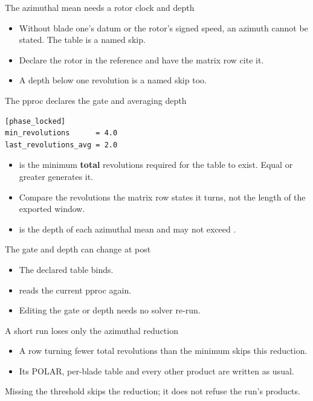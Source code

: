 \begin{frame}{The azimuthal mean needs a rotor clock and depth}
\begin{itemize}
  \item Without blade one's datum or the rotor's signed speed, an azimuth
        cannot be stated. The table is a named skip.
  \item Declare the rotor in the reference and have the matrix row cite it.
  \item A depth below one revolution is a named skip too.
\end{itemize}
\end{frame}

\begin{frame}[fragile]{The pproc declares the gate and averaging depth}
\begin{lstlisting}[style=ftsbase]
[phase_locked]
min_revolutions      = 4.0
last_revolutions_avg = 2.0
\end{lstlisting}
\begin{itemize}\small
  \item {} is the minimum \textbf{total} revolutions
        required for the table to exist. Equal or greater generates it.
  \item Compare the revolutions the matrix row states it turns,
        not the length of the exported window.
  \item {} is the depth of each azimuthal mean
        and may not exceed .
\end{itemize}
\end{frame}

\begin{frame}{The gate and depth can change at post}
\begin{itemize}
  \item The declared  table binds.
  \item {} reads the current pproc again.
  \item Editing the gate or depth needs no solver re-run.
\end{itemize}
\end{frame}

\begin{frame}{A short run loses only the azimuthal reduction}
\begin{itemize}
  \item A row turning fewer total revolutions than the minimum skips this
        reduction.
  \item Its POLAR, per-blade table and every other product are written as usual.
\end{itemize}
\begin{takeaway}
Missing the threshold skips the reduction; it does not refuse the run's products.
\end{takeaway}
\end{frame}

